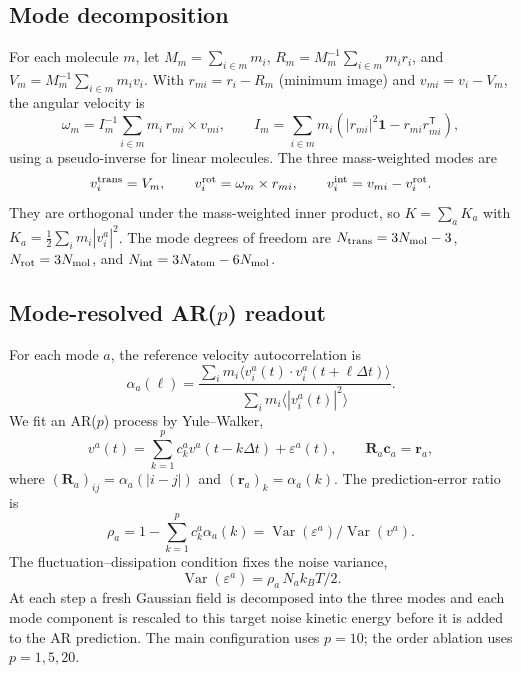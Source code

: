 \subsection{Mode decomposition}

For each molecule \(m\), let \(M_m=\sum_{i\in m}m_i\), \(R_m=M_m^{-1}\sum_{i\in m}m_i r_i\), and
\(V_m=M_m^{-1}\sum_{i\in m}m_i v_i\). With \(r_{mi}=r_i-R_m\) (minimum image) and
\(v_{mi}=v_i-V_m\), the angular velocity is
\begin{equation}
\omega_m=I_m^{-1}\sum_{i\in m}m_i\,r_{mi}\times v_{mi},\qquad
I_m=\sum_{i\in m}m_i\left(|r_{mi}|^2\mathbf 1-r_{mi}r_{mi}^{\mathsf T}\right),
\end{equation}
using a pseudo-inverse for linear molecules. The three mass-weighted modes are
\begin{equation}
v_i^{\rm trans}=V_m,\qquad
v_i^{\rm rot}=\omega_m\times r_{mi},\qquad
v_i^{\rm int}=v_{mi}-v_i^{\rm rot}.
\end{equation}
They are orthogonal under the mass-weighted inner product, so
\(K=\sum_a K_a\) with \(K_a=\tfrac12\sum_i m_i|v_i^a|^2\). The mode degrees of freedom are
\(N_{\rm trans}=3N_{\rm mol}-3\), \(N_{\rm rot}=3N_{\rm mol}\), and
\(N_{\rm int}=3N_{\rm atom}-6N_{\rm mol}\).

\subsection{Mode-resolved AR($p$) readout}

For each mode \(a\), the reference velocity autocorrelation is
\begin{equation}
\alpha_a(\ell)=\frac{\sum_i m_i\langle v_i^a(t)\cdot v_i^a(t+\ell\Delta t)\rangle}
{\sum_i m_i\langle |v_i^a(t)|^2\rangle}.
\end{equation}
We fit an AR(\(p\)) process by Yule--Walker,
\begin{equation}
v^a(t)=\sum_{k=1}^{p}c_k^a v^a(t-k\Delta t)+\varepsilon^a(t),\qquad
\mathbf R_a\mathbf c_a=\mathbf r_a,
\end{equation}
where \((\mathbf R_a)_{ij}=\alpha_a(|i-j|)\) and \((\mathbf r_a)_k=\alpha_a(k)\). The
prediction-error ratio is
\begin{equation}
\rho_a=1-\sum_{k=1}^{p}c_k^a\alpha_a(k)
=\operatorname{Var}(\varepsilon^a)/\operatorname{Var}(v^a).
\end{equation}
The fluctuation--dissipation condition fixes the noise variance,
\begin{equation}
\operatorname{Var}(\varepsilon^a)=\rho_a\,N_a k_BT/2.
\end{equation}
At each step a fresh Gaussian field is decomposed into the three modes and each mode component is
rescaled to this target noise kinetic energy before it is added to the AR prediction. The main
configuration uses \(p=10\); the order ablation uses \(p=1,5,20\).

